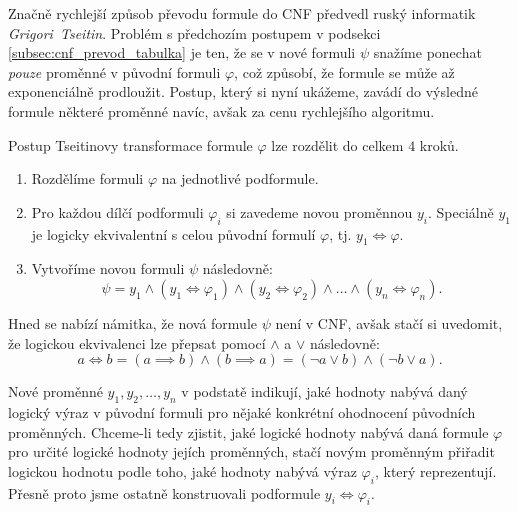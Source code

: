 Značně rychlejší způsob převodu formule do CNF předvedl ruský informatik \emph{Grigori~Tseitin}. Problém s předchozím postupem v podsekci \ref{subsec:cnf_prevod_tabulka} je ten, že se v nové formuli $\psi$ snažíme ponechat \emph{pouze} proměnné v původní formuli $\varphi$, což způsobí, že formule se může až exponenciálně prodloužit. Postup, který si nyní ukážeme, zavádí do výsledné formule některé proměnné navíc, avšak za cenu rychlejšího algoritmu.

Postup Tseitinovy transformace formule $\varphi$ lze rozdělit do celkem $4$ kroků.
\begin{enumerate}
    \item Rozdělíme formuli $\varphi$ na jednotlivé podformule.
    \item Pro každou dílčí podformuli $\varphi_i$ si zavedeme novou proměnnou $y_i$. Speciálně $y_1$ je logicky ekvivalentní s celou původní formulí $\varphi$, tj. $y_1\iff\varphi$.
    \item Vytvoříme novou formuli $\psi$ následovně:
    \[\psi=y_1\land(y_1\iff\varphi_1)\land(y_2\iff\varphi_2)\land\dots\land(y_n\iff\varphi_n).\]
\end{enumerate}
Hned se nabízí námitka, že nová formule $\psi$ není v CNF, avšak stačí si uvedomit, že logickou ekvivalenci lze přepsat pomocí $\land$ a $\lor$ následovně:
\begin{equation}\label{eq:equiv_identita}
    a\iff b=(a\implies b)\land(b\implies a)=(\neg a\lor b)\land(\neg b\lor a).
\end{equation}

Nové proměnné $y_1,y_2,\dots,y_n$ v podstatě indikují, jaké hodnoty nabývá daný logický výraz v původní formuli pro nějaké konkrétní ohodnocení původních proměnných. Chceme-li tedy zjistit, jaké logické hodnoty nabývá daná formule $\varphi$ pro určité logické hodnoty jejích proměnných, stačí novým proměnným přiřadit logickou hodnotu podle toho, jaké hodnoty nabývá výraz $\varphi_i$, který reprezentují. Přesně proto jsme ostatně konstruovali podformule $y_i\iff\varphi_i$.

